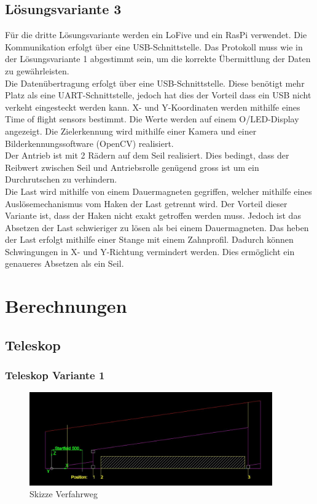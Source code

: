\documentclass[a4paper]{report}
\begin{document}
\section{Lösungsvariante 3}
\label{app:sec:Lvar3}
Für die dritte Lösungsvariante werden ein LoFive und ein RasPi verwendet. Die Kommunikation erfolgt über eine USB-Schnittstelle.
Das Protokoll muss wie in der Lösungsvariante 1 abgestimmt sein, um die korrekte Übermittlung der Daten zu gewährleisten.\\
Die Datenübertragung erfolgt über eine USB-Schnittstelle. Diese benötigt mehr Platz als eine UART-Schnittstelle, jedoch hat dies der Vorteil dass ein USB nicht verkeht eingesteckt werden kann.
X- und Y-Koordinaten werden mithilfe eines Time of flight sensors bestimmt. Die Werte werden auf einem O/LED-Display angezeigt.
Die Zielerkennung wird mithilfe einer Kamera und einer Bilderkennungssoftware (OpenCV) realisiert.\\
Der Antrieb ist mit 2 Rädern auf dem Seil realisiert. Dies bedingt, dass der Reibwert zwischen Seil und Antriebsrolle genügend gross ist um ein Durchrutschen zu verhindern.\\
Die Last wird mithilfe von einem Dauermagneten gegriffen, welcher mithilfe eines Auslösemechanismus vom Haken der Last getrennt wird. Der Vorteil dieser Variante ist, dass der Haken nicht exakt getroffen werden muss. Jedoch ist das Absetzen der Last schwieriger zu lösen als bei einem Dauermagneten. Das heben der Last erfolgt mithilfe einer Stange mit einem Zahnprofil. Dadurch können Schwingungen in X- und Y-Richtung vermindert werden. Dies ermöglicht ein genaueres Absetzen als ein Seil.\\

\chapter{Berechnungen}
\label{app:ch:Berechnung}
\section{Teleskop}
\label{app:sec:Teleskjope}
\subsection{Teleskop Variante 1}
\label{app:ssec:TeleskopjeVar1}
\begin{figure}[h]
	\centering
	\includegraphics[keepaspectratio,height=4cm]{Teleskoparm1.JPG}
	\caption{Skizze Verfahrweg}
	\label{fig:Skizze Verfahrweg}
\end{figure}
\end{document}
